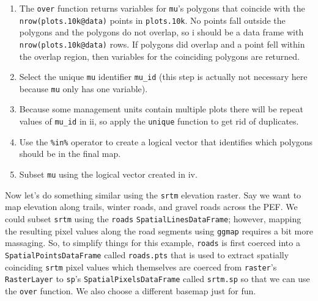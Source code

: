 \documentclass[
]{krantz}
\providecommand{\tightlist}{%
  \setlength{\itemsep}{0pt}\setlength{\parskip}{0pt}}
\begin{document}
\begin{enumerate}
\def\labelenumi{\roman{enumi}.}
\tightlist
\item
  The \texttt{over} function returns variables for \texttt{mu}'s polygons that coincide with the \texttt{nrow(plots.10k@data)} points in \texttt{plots.10k}. No points fall outside the polygons and the polygons do not overlap, so i should be a data frame with \texttt{nrow(plots.10k@data)} rows. If polygons did overlap and a point fell within the overlap region, then variables for the coinciding polygons are returned.
\item
  Select the unique \texttt{mu} identifier \texttt{mu\_id} (this step is actually not necessary here because \texttt{mu} only has one variable).
\item
  Because some management units contain multiple plots there will be repeat values of \texttt{mu\_id} in ii, so apply the \texttt{unique} function to get rid of duplicates.
\item
  Use the \texttt{\%in\%} operator to create a logical vector that identifies which polygons should be in the final map.
\item
  Subset \texttt{mu} using the logical vector created in iv.
\end{enumerate}

Now let's do something similar using the \texttt{srtm} elevation raster. Say we want to map elevation along trails, winter roads, and gravel roads across the PEF. We could subset \texttt{srtm} using the \texttt{roads} \texttt{SpatialLinesDataFrame}; however, mapping the resulting pixel values along the road segments using \texttt{ggmap} requires a bit more massaging. So, to simplify things for this example, \texttt{roads} is first coerced into a \texttt{SpatialPointsDataFrame} called \texttt{roads.pts} that is used to extract spatially coinciding \texttt{srtm} pixel values which themselves are coerced from \texttt{raster}'s \texttt{RasterLayer} to \texttt{sp}'s \texttt{SpatialPixelsDataFrame} called \texttt{srtm.sp} so that we can use the \texttt{over} function. We also choose a different basemap just for fun.
\end{document}
